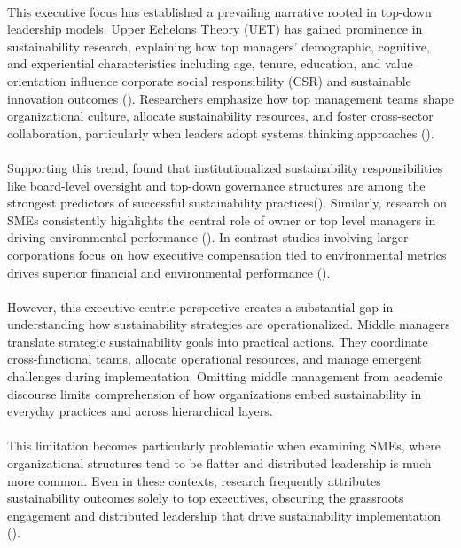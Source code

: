 	\paragraph*{} This executive focus has established a prevailing narrative rooted in top-down leadership models. Upper Echelons Theory (UET) has gained prominence in sustainability research, explaining how top managers' demographic, cognitive, and experiential characteristics including age, tenure, education, and value orientation influence corporate social responsibility (CSR) and sustainable innovation outcomes (\textcite{Waldman2008, Ioannou2015}). Researchers emphasize how top management teams shape organizational culture, allocate sustainability resources, and foster cross-sector collaboration, particularly when leaders adopt systems thinking approaches (\textcite{Dyllick2016}).
	
	\paragraph*{} Supporting this trend, \citeauthor{keil2024c} found that institutionalized sustainability responsibilities like board-level oversight and top-down governance structures are among the strongest predictors of successful sustainability practices(\textcite{keil2024c}). Similarly, research on SMEs consistently highlights the central role of owner or top level managers in driving environmental performance (\textcite{kutzschbach2021c}). In contrast studies involving larger corporations focus on how executive compensation tied to environmental metrics drives superior financial and environmental performance (\textcite{Eccles2014}).
	
	\paragraph*{} However, this executive-centric perspective creates a substantial gap in understanding how sustainability strategies are operationalized. Middle managers translate strategic sustainability goals into practical actions. They coordinate cross-functional teams, allocate operational resources, and manage emergent challenges during implementation. Omitting middle management from academic discourse limits comprehension of how organizations embed sustainability in everyday practices and across hierarchical layers.
	
	\paragraph*{} This limitation becomes particularly problematic when examining SMEs, where organizational structures tend to be flatter and distributed leadership is much more common. Even in these contexts, research frequently attributes sustainability outcomes solely to top executives, obscuring the grassroots engagement and distributed leadership that drive sustainability implementation (\textcite{birkinshaw2010}).
	

